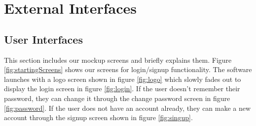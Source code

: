 \section{External Interfaces}

\subsection{User Interfaces}
This section includes our mockup screens and briefly explains them. Figure \ref{fig:startingScreens} shows our screens for login/signup functionality. The software launches with a logo screen shown in figure \ref{fig:logo} which slowly fades out to display the login screen in figure \ref{fig:login}. If the user doesn't remember their password, they can change it through the change password screen in figure \ref{fig:password}. If the user does not have an account already, they can make a new account through the signup screen shown in figure \ref{fig:singup}.
